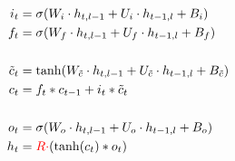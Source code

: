 \documentclass{article}
\begin{document}
\begin{preview}

\begin{align*}
    i_t &= \sigma(W_i \cdot h_{t,l-1} + U_i \cdot h_{t-1,l} + B_i) \\
    f_t &= \sigma(W_f \cdot h_{t,l-1} + U_f \cdot h_{t-1,l} + B_f) \\
    & \\
    \tilde{c}_t &= \tanh(W_{\tilde{c}} \cdot h_{t,l-1} + U_{\tilde{c}} \cdot h_{t-1,l} + B_{\tilde{c}}) \\
    c_t &= f_t * c_{t-1} + i_t * \tilde{c}_t \\
    & \\
    o_t &= \sigma(W_o \cdot h_{t,l-1} + U_o \cdot h_{t-1,l} + B_o) \\
    h_t &= \textcolor{red}{R \cdot} (\tanh(c_t) * o_t) \\
\end{align*}

\end{preview}
\end{document}

